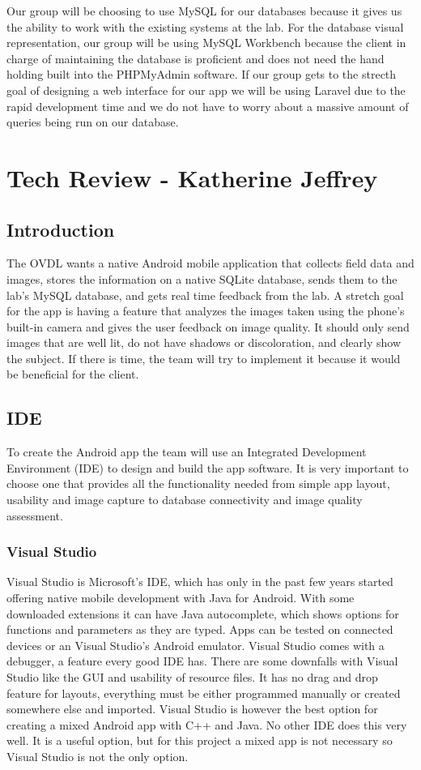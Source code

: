 \documentclass[onecolumn, draftclsnofoot,10pt, compsoc]{IEEEtran}
\begin{document}
Our group will be choosing to use MySQL for our databases because it gives us the ability to work with the existing systems at the lab. For the database visual representation, our group will be using MySQL Workbench because the client in charge of maintaining the database is proficient and does not need the hand holding built into the PHPMyAdmin software. If our group gets to the strecth goal of designing a web interface for our app we will be using Laravel due to the rapid development time and we do not have to worry about a massive amount of queries being run on our database. 
 
 \section{Tech Review - Katherine Jeffrey}
 \subsection{Introduction}
The OVDL wants a native Android mobile application that collects field data and images, stores the information on a native SQLite database, sends them to the lab's MySQL database, and gets real time feedback from the lab. 
A stretch goal for the app is having a feature that analyzes the images taken using the phone's built-in camera and gives the user feedback on image quality. 
It should only send images that are well lit, do not have shadows or discoloration, and clearly show the subject. 
If there is time, the team will try to implement it because it would be beneficial for the client. 

\subsection{IDE}
To create the Android app the team will use an Integrated Development Environment (IDE) to design and build the app software. 
It is very important to choose one that provides all the functionality needed from simple app layout, usability and image capture to database connectivity and image quality assessment. 

\subsubsection{Visual Studio}
Visual Studio is Microsoft's IDE, which has only in the past few years started offering native mobile development with Java for Android. 
With some downloaded extensions it can have Java autocomplete, which shows options for functions and parameters as they are typed. 
Apps can be tested on connected devices or an Visual Studio's Android emulator. 
Visual Studio comes with a debugger, a feature every good IDE has. 
There are some downfalls with Visual Studio like the GUI and usability of resource files. 
It has no drag and drop feature for layouts, everything must be either programmed manually or created somewhere else and imported. 
Visual Studio is however the best option for creating a mixed Android app with C++ and Java. 
No other IDE does this very well. 
It is a useful option, but for this project a mixed app is not necessary so Visual Studio is not the only option. 
\cite{Studios}
\end{document}
